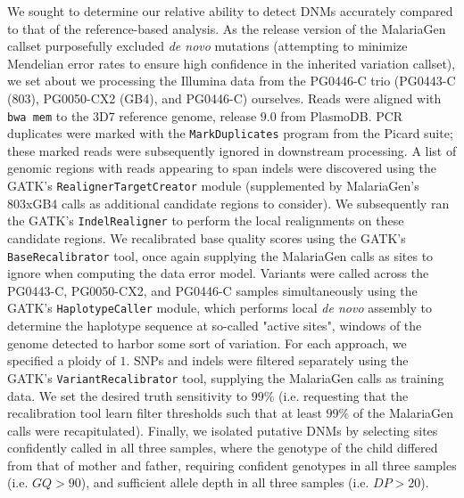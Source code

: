 We sought to determine our relative ability to detect DNMs accurately compared to that of the reference-based analysis.  As the release version of the MalariaGen callset purposefully excluded \textit{de novo} mutations (attempting to minimize Mendelian error rates to ensure high confidence in the inherited variation callset), we set about we processing the Illumina data from the PG0446-C trio (PG0443-C (803), PG0050-CX2 (GB4), and PG0446-C) ourselves.  Reads were aligned with \texttt{bwa mem} to the 3D7 reference genome, release $9.0$ from PlasmoDB.  PCR duplicates were marked with the \texttt{MarkDuplicates} program from the Picard suite; these marked reads were subsequently ignored in downstream processing.  A list of genomic regions with reads appearing to span indels were discovered using the GATK's \texttt{RealignerTargetCreator} module (supplemented by MalariaGen's 803xGB4 calls as additional candidate regions to consider).  We subsequently ran the GATK's \texttt{IndelRealigner} to perform the local realignments on these candidate regions.  We recalibrated base quality scores using the GATK's \texttt{BaseRecalibrator} tool, once again supplying the MalariaGen calls as sites to ignore when computing the data error model.  Variants were called across the PG0443-C, PG0050-CX2, and PG0446-C samples simultaneously using the GATK's \texttt{HaplotypeCaller} module, which performs local \textit{de novo} assembly to determine the haplotype sequence at so-called "active sites", windows of the genome detected to harbor some sort of variation.  For each approach, we specified a ploidy of $1$.  SNPs and indels were filtered separately using the GATK's \texttt{VariantRecalibrator} tool, supplying the MalariaGen calls as training data.  We set the desired truth sensitivity to $99\%$ (i.e. requesting that the recalibration tool learn filter thresholds such that at least $99\%$ of the MalariaGen calls were recapitulated).  Finally, we isolated putative DNMs by selecting sites confidently called in all three samples, where the genotype of the child differed from that of mother and father, requiring confident genotypes in all three samples (i.e. $GQ > 90$), and sufficient allele depth in all three samples (i.e. $DP > 20$).

